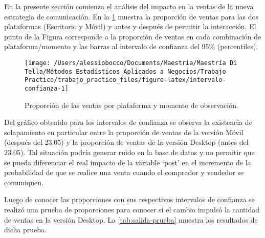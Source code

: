 \documentclass[
  12pt]{article}
\begin{document}
En la presente sección comienza el análisis del impacto en la ventas de la nueva estrategia de comunicación. En la \ref{fig:intervalo-confianza} muestra la proporción de ventas para las dos plataformas (Escritorio y Móvil) y antes y después de permitir la interacción. El punto de la Figura corresponde a la proporción de ventas en cada combinación de plataforma/momento y las barras al intervalo de confianza del 95\% (percentiles).

\begin{figure}

{\centering \texttt{[image: /Users/alessiobocco/Documents/Maestria/Maestría Di Tella/Métodos Estadísticos Aplicados a Negocios/Trabajo Practico/trabajo\_practico\_files/figure-latex/intervalo-confianza-1]} 

}

\caption{Proporción de las ventas por plataforma y momento de observación.}\label{fig:intervalo-confianza}
\end{figure}

Del gráfico obtenido para los intervalos de confianza se observa la existencia de solapamiento en particular entre la proporción de ventas de la versión Móvil (después del 23.05) y la proporción de ventas de la versión Desktop (antes del 23.05). Tal situación podría generar ruido en la base de datos y no permitir que se pueda diferenciar el real impacto de la variable `post' en el incremento de la probabilidad de que se realice una venta cuando el comprador y vendedor se comuniquen.

Luego de conocer las proporciones con sus respectivos intervalos de confianza se realizó una prueba de proporciones para conocer si el cambio impulsó la cantidad de ventas en la versión Desktop. La \ref{tab:salida-prueba} muestra los resultados de dicha prueba.

\begin{table}[H]

\caption{\label{tab:salida-prueba}Resúmen de la prueba de hipótesis.}
\centering
{}
\end{table}
\end{document}
